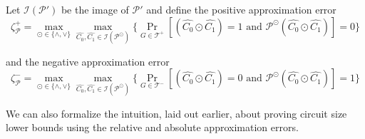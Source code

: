 \begin{definition}
\label{def:one-step-errors}
    Let $\mathcal{I}(\mathcal{P}')$ be the image of $\mathcal{P}'$ and define the positive approximation error
    \begin{equation*}
        \zeta^+_{\mathcal{P}} = \max_{\odot \in \{\wedge, \vee\}} \max_{\hat{C_0}, \hat{C_1} \in \mathcal{I}(\mathcal{P}^\odot)} \{ \Pr_{G \in \mathcal{T}^+}[(\hat{C_0} \odot \hat{C_1})=1 \text{ and } \mathcal{P}^{\odot}(\hat{C_0} \odot \hat{C_1})] = 0 \}
    \end{equation*}

    and the negative approximation error 
    \begin{equation*}
        \zeta^-_{\mathcal{P}} = \max_{\odot \in \{\wedge, \vee\}} \max_{\hat{C_0}, \hat{C_1} \in \mathcal{I}(\mathcal{P}^\odot)} \{ \Pr_{G \in \mathcal{T}^-}[(\hat{C_0} \odot \hat{C_1})=0 \text{ and } \mathcal{P}^\odot(\hat{C_0} \odot \hat{C_1})] = 1 \}
    \end{equation*}

\end{definition}


We can also formalize the intuition, laid out earlier, about proving circuit size lower bounds using the relative and absolute approximation errors.

